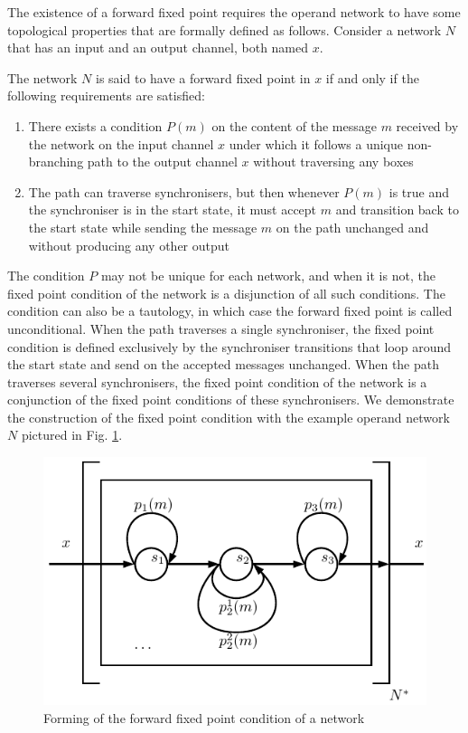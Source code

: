 The existence of a forward fixed point requires the operand network to have some topological properties that are formally defined as follows. Consider a network $N$ that has an input and an output channel, both named $x$.

\begin{definition}\label{ffp_def}The network $N$ is said to have a forward fixed point in $x$ if and only if the following requirements are satisfied:
\begin{enumerate}
\item There exists a condition $P(m)$ on the content of the message $m$ received by the network on the input channel $x$ under which it follows a unique non-branching path to the output channel $x$ without traversing any boxes
\item The path can traverse synchronisers, but then whenever $P(m)$ is true and the synchroniser is in the start state, it must accept $m$ and transition back to the start state while sending the message $m$ on the path unchanged and without producing any other output%
\end{enumerate}
\end{definition}

The condition $P$ may not be unique for each network, and when it is not, the fixed point condition of the network is a disjunction of all such conditions. The condition can also be a tautology, in which case the forward fixed point is called unconditional. When the path traverses a single synchroniser, the fixed point condition is defined exclusively by the synchroniser transitions that loop around the start state and send on the accepted messages unchanged. When the path traverses several synchronisers, the fixed point condition of the network is a conjunction of the fixed point conditions of these synchronisers. We demonstrate the construction of the fixed point condition with the example operand network $N$ pictured in Fig. \ref{fig:ffp}.

\begin{figure}[h!]
\centering
\includegraphics[scale=0.8]{figs/chapter_04_ffp.pdf}
\caption{Forming of the forward fixed point condition of a network}
\label{fig:ffp}
\end{figure}

